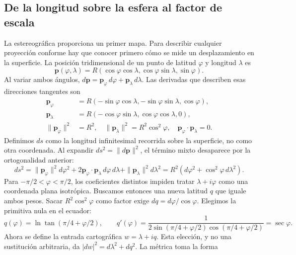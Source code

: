 \subsection{De la longitud sobre la esfera al factor de escala}
La estereográfica proporciona un primer mapa. Para describir cualquier proyección conforme hay que conocer primero cómo se mide un desplazamiento en la superficie. La posición tridimensional de un punto de latitud $\varphi$ y longitud $\lambda$ es
\begin{equation}
 \mathbf p(\varphi,\lambda)=R(\cos\varphi\cos\lambda,\cos\varphi\sin\lambda,\sin\varphi).
 \label{eq:parametrizacion}
\end{equation}
Al variar ambos ángulos, $d\mathbf p=\mathbf p_\varphi\,d\varphi+\mathbf p_\lambda\,d\lambda$. Las derivadas que describen esas direcciones tangentes son
\begin{equation}
 \begin{aligned}
 \mathbf p_\varphi&=R(-\sin\varphi\cos\lambda,-\sin\varphi\sin\lambda,\cos\varphi),\\
 \mathbf p_\lambda&=R(-\cos\varphi\sin\lambda,\cos\varphi\cos\lambda,0),\\
 \|\mathbf p_\varphi\|^2&=R^2,\quad
 \|\mathbf p_\lambda\|^2=R^2\cos^2\varphi,\quad
 \mathbf p_\varphi\cdot\mathbf p_\lambda=0.
 \end{aligned}\label{eq:tangentes}
\end{equation}
Definimos $ds$ como la longitud infinitesimal recorrida sobre la superficie, no como otra coordenada. Al expandir $ds^2=\|d\mathbf p\|^2$, el término mixto desaparece por la ortogonalidad anterior:
\begin{equation}
 ds^2=\|\mathbf p_\varphi\|^2d\varphi^2
 +2\mathbf p_\varphi\cdot\mathbf p_\lambda\,d\varphi\,d\lambda
 +\|\mathbf p_\lambda\|^2d\lambda^2
 =R^2(d\varphi^2+\cos^2\varphi\,d\lambda^2).
 \label{eq:metrica}
\end{equation}
Para $-\pi/2<\varphi<\pi/2$, los coeficientes distintos impiden tratar $\lambda+i\varphi$ como una coordenada plana isotrópica. Buscamos entonces una nueva latitud $q$ que iguale ambos pesos. Sacar $R^2\cos^2\varphi$ como factor exige $dq=d\varphi/\cos\varphi$. Elegimos la primitiva nula en el ecuador:
\begin{equation}
 q(\varphi)=\ln\tan(\pi/4+\varphi/2),\qquad
 q'(\varphi)=\frac1{2\sin(\pi/4+\varphi/2)\cos(\pi/4+\varphi/2)}=\sec\varphi.
 \label{eq:q}
\end{equation}
Ahora se define la entrada cartográfica $w=\lambda+iq$. Esta elección, y no una sustitución arbitraria, da $|dw|^2=d\lambda^2+dq^2$. La métrica toma la forma
